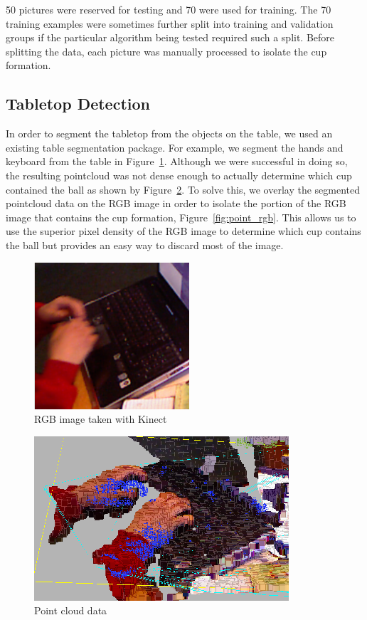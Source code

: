 \documentclass[letterpaper, 10 pt, conference]{ieeeconf}  %
\begin{document}
50 pictures were reserved for testing and 70 were used for training.  The 70 training examples were sometimes further split into training and validation groups if the particular algorithm being tested required such a split.  Before splitting the data, each picture was manually processed to isolate the cup formation.

\subsection{Tabletop Detection}


In order to segment the tabletop from the objects on the table, we used an existing table segmentation package.  For example, we segment the hands and keyboard from the table in Figure~\ref{fig:rgb}. Although we were successful in doing so, the resulting pointcloud was not dense enough to actually determine which cup contained the ball as shown by Figure~\ref{fig:point}.  To solve this, we overlay the segmented pointcloud data on the RGB image in order to isolate the portion of the RGB image that contains the cup formation, Figure~\ref{fig:point_rgb}.  This allows us to use the superior pixel density of the RGB image to determine which cup contains the ball but provides an easy way to discard most of the image.

\begin{figure}[thpb]
      \centering
	  \includegraphics[scale =0.5]{rgb}
      \caption{RGB image taken with Kinect}
      \label{fig:rgb}
\end{figure}

\begin{figure}[thpb]
      \centering
	  \includegraphics[scale =0.5]{point}
      \caption{Point cloud data}
      \label{fig:point}
\end{figure}
\end{document}

